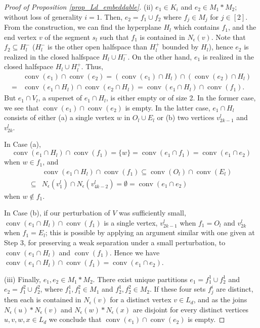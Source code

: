 \documentclass{article}
\theoremstyle{definition}
\DeclareMathOperator{\conv}{conv}
\begin{document}
\begin{proof}[Proof of Proposition \ref{prop_Ld_embeddable}]
\smallskip

(ii) $e_1\in K_i$ and $e_2\in M_1*M_2$; without loss of generality $i=1$.  Then, $e_2 = f_1\cup f_2$ where $f_j \in M_j$ for $j\in [2]$. From the construction, we can find 
the hyperplane $H_l$ which contains $f_1$, and the end vertex $v$ of the segment $s_l$ such that $f_1$ is contained in $N_\epsilon(v)$. 
Note that $f_2 \subseteq H_l^-$ ($H_l^-$ is the other open halfspace than $H_l^+$ bounded by $H_l$), hence $e_2$ is realized in the closed halfspace $H_l\cup  H_l^-$. 
On the other hand, $e_1$ is realized in the closed halfspace 
$H_l\cup  H_l^+$. 
Thus,
\begin{align*}
&\conv(e_1)\cap \conv(e_2) = (\conv(e_1)\cap H_l)\cap (\conv(e_2)\cap H_l)\\
= &\conv(e_1 \cap H_l) \cap \conv(e_2 \cap H_l)=\conv(e_1 \cap H_l) \cap \conv(f_1).
\end{align*}
But $e_1 \cap V_l$, a superset of $e_1 \cap H_l$, is either empty or of size 2. In the former case, we see that $\conv(e_1)\cap \conv(e_2)$ is empty. In the latter case, $e_1 \cap H_l$ consists of either (a) a single vertex $w$ in $O_l\cup E_l$ or (b) two vertices $v^l_{2k-1}$ and $v^l_{2k}$. 

In Case (a),  \[\conv(e_1 \cap H_l)\cap \conv(f_1)=\{w\}=\conv(e_1 \cap f_1)=\conv(e_1\cap e_2)\] 
 when $w\in f_1$, and
\begin{align*}
&\conv(e_1 \cap H_l)\cap \conv(f_1)\subseteq \conv(O_l)\cap \conv(E_l)\\
\subseteq &N_\epsilon(v^l_1)\cap N_\epsilon(v^l_{4k-2}) =\emptyset = \conv(e_1 \cap e_2)
\end{align*}
 when $w \notin f_1$.

In Case (b), if our perturbation of $V$ was sufficiently small, $\conv(e_1\cap H_l)\cap \conv(f_1)$ is a single vertex, $v^l_{2k-1}$ when $f_1=O_l$ and $v^l_{2k}$ when $f_1=E_l$; this is possible by applying an argument similar with one given at Step 3, for preserving a weak separation under a small perturbation, to $\conv(e_1\cap H_l)$ and $\conv(f_1)$. Hence we have $\conv(e_1\cap H_l)\cap \conv(f_1)=\conv(e_1\cap e_2)$.

\smallskip

(iii) Finally, $e_1, e_2\in M_1*M_2$.
There exist unique partitions $e_1=f_1^1\cup f_2^1$ and $e_2=f_1^2 \cup f_2^2$, where $f_1^1, f_1^2 \in M_1$ and $f_2^1, f_2^2 \in M_2$. 
If these four sets $f_j^i$ are distinct, then each is contained in $N_\epsilon(v)$ for a distinct vertex $v\in L_d$, and as the joins $N_\epsilon(u)*N_\epsilon(v)$ and $N_\epsilon(w)*N_\epsilon(x)$ are disjoint for every distinct vertices $u,v,w,x\in L_d$ we conclude that $\conv(e_1)\cap \conv(e_2)$ is empty. 


\end{proof}
\end{document}
